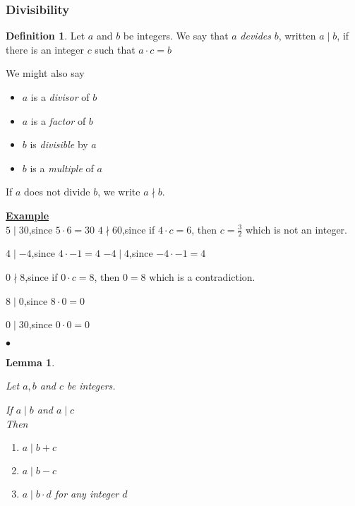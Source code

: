 \documentclass[fleqn,letterpaper,10pt,twoside]{report}
\newcounter{example}
\newenvironment{example}
{\underline{\sffamily\bfseries Example \theexample}\\}
{\hspace*{\fill}$\bullet$ \stepcounter{example}}
\theoremstyle{plain}
\newtheorem{lemma}[theorem]{Lemma}
\theoremstyle{definition}
\newtheorem{definition}{Definition}[section]
\theoremstyle{remark}
\begin{document}
\subsubsection{Divisibility}
\begin{definition}

   Let \(a\) and \(b\) be integers. We say that \(a\) \textit{devides}
   \(b\), written \(a \mid b\), if there is an integer \(c\) such that
   \(a \cdot c = b\)

   We might also say
   \begin{itemize}
      \item{\(a\) is a \textit{divisor} of \(b\)}
      \item{\(a\) is a \textit{factor} of \(b\)}
      \item{\(b\) is \textit{divisible} by \(a\)}
      \item{\(b\) is a \textit{multiple} of \(a\)}
   \end{itemize}

   If \(a\) does not divide \(b\), we write \(a \nmid b\).
\end{definition}

\begin{example}

   \(5 \mid 30 \),\enskip since \(5 \cdot 6 = 30 \)
   \(4 \nmid 60 \),\enskip since if \(4 \cdot c = 6 \), then \(c = \frac{3}{2}\) which is not an integer.

   \(4 \mid -4 \),\enskip since \(4 \cdot -1 = 4 \)
   \(-4 \mid 4 \),\enskip since \(-4 \cdot -1 = 4 \)

   \(0 \nmid 8 \),\enskip since if \(0 \cdot c = 8 \), then \(0 = 8\) which is a contradiction.

   \(8 \mid 0 \),\enskip since \(8 \cdot 0 = 0 \)

   \(0 \mid 30 \),\enskip since \(0 \cdot 0 = 0 \)

\end{example}

\begin{lemma}{\ }

   Let \(a, b\) and \(c\) be integers.

   If \(a \mid b\) and \(a \mid c\) \\
   Then
   \begin{enumerate}
      \item{\(a \mid b + c\)}
      \item{\(a \mid b - c\)}
      \item{\(a \mid b \cdot d\) for any integer \(d\)}
   \end{enumerate}

\end{lemma}
\end{document}
